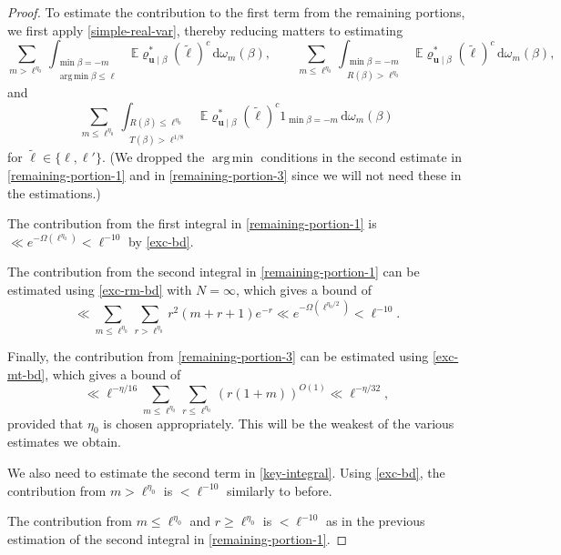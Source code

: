 \documentclass[11pt,reqno]{amsart}
\DeclareMathOperator*{\argmin}{arg\,min}
\numberwithin{equation}{section}
\theoremstyle{definition}
\theoremstyle{remark}
\newcommand{\mb}{\mathbb}
\newcommand{\mbf}{\mathbf}
\renewcommand{\le}{\leqslant}
\renewcommand{\ge}{\geqslant}
\begin{document}
\begin{proof}
To estimate the contribution to the first term from the remaining portions, we first apply \cref{simple-real-var}, thereby reducing matters to estimating
\begin{equation}\label{remaining-portion-1} \sum_{m >\ell^{\eta_0}}\int_{\substack{\min \beta = -m \\\argmin \beta  \le \ell }}
\mb{E} \varrho^*_{\mbf{u} \mid \beta}(\tilde\ell)^c  \, \mathrm{d}\omega_m(\beta),\qquad \sum_{m \le \ell^{\eta_0}}\int_{\substack{\min \beta = -m \\
R(\beta) > \ell^{\eta_0}}}
\mb{E} \varrho^*_{\mbf{u} \mid \beta}(\tilde\ell)^c  \, \mathrm{d}\omega_m(\beta),\end{equation} 
and
\begin{equation}\label{remaining-portion-3} \sum_{m \le \ell^{\eta_0}}\int_{\substack{R(\beta) \le \ell^{\eta_0} \\ T(\beta) > \ell^{1/8}}}
\mb{E} \varrho^*_{\mbf{u} \mid \beta}(\tilde\ell)^c 1_{\min \beta = -m} \, \mathrm{d}\omega_m(\beta)\end{equation} for $\tilde\ell \in \{ \ell, \ell'\}$. (We dropped the $\argmin$ conditions in the second estimate in \cref{remaining-portion-1} and in \cref{remaining-portion-3} since we will not need these in the estimations.)

The contribution from the first integral in \cref{remaining-portion-1} is $\ll e^{-\Omega(\ell^{\eta_0})} < \ell^{-10}$ by \cref{exc-bd}.

The contribution from the second integral in \cref{remaining-portion-1} can be estimated using \cref{exc-rm-bd} with $N = \infty$, which gives a bound of 
\begin{equation}\label{mr-bd} \ll \sum_{m \le \ell^{\eta_0}} \sum_{r > \ell^{\eta_0}} r^2 (m + r + 1) e^{-r} \ll e^{-\Omega(\ell^{\eta_0/2})} < \ell^{-10}. \end{equation}

Finally, the contribution from \cref{remaining-portion-3} can be estimated using \cref{exc-mt-bd}, which gives a bound of
\[ \ll \ell^{-\eta/16} \sum_{m \le \ell^{\eta_0}} \sum_{r \le \ell^{\eta_0}} (r(1 + m))^{O(1)} \ll \ell^{-\eta/32},\]
provided that $\eta_0$ is chosen appropriately. This will be the weakest of the various estimates we obtain.

We also need to estimate the second term in \cref{key-integral}. Using \cref{exc-bd}, the contribution from $m > \ell^{\eta_0}$ is $< \ell^{-10}$ similarly to before.

The contribution from $m \le \ell^{\eta_0}$ and $r \ge \ell^{\eta_0}$ is $< \ell^{-10}$ as in the previous estimation of the second integral in \cref{remaining-portion-1}.


\end{proof}
\end{document}
